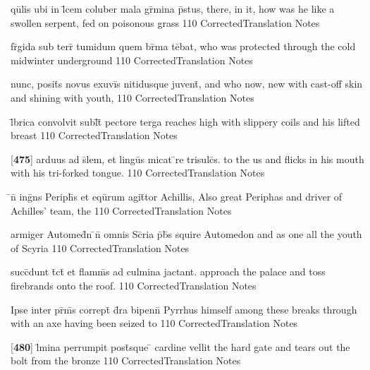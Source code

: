 \latline
  {qu\={}lis ubi in l\={}cem coluber mala gr\={}mina p\={}stus,}
  { there, in it, how was he like a swollen serpent, fed on poisonous grass }
  {110}
  { CorrectedTranslation }
  { Notes }


\latline
  {fr\={\macron {\i}}gida sub terr\={} tumidum quem br\={}ma te\={}bat,}
  { who was protected through the cold midwinter underground }
  {110}
  { CorrectedTranslation }
  { Notes }


\latline
  {nunc, posit\={\macron {\i}}s novus exuvi\={\macron {\i}}s nitidusque juvent\={},}
  { and who now, new with cast-off skin and shining with youth,  }
  {110}
  { CorrectedTranslation }
  { Notes }


\latline
  {l\={}brica convolvit subl\={}t\={} pectore terga}
  { reaches high with slippery coils and his lifted breast  }
  {110}
  { CorrectedTranslation }
  { Notes }


\latline
  {[\textbf{475}] arduus ad s\={}lem, et lingu\={\macron {\i}}s micat \={}re trisulc\={\macron {\i}}s.}
  { to the us and flicks in his mouth with his tri-forked tongue. }
  {110}
  { CorrectedTranslation }
  { Notes }


\latline
  {\={}n\={} ing\={}ns Periph\={}s et equ\={}rum agit\={}tor Achillis,}
  { Also great Periphas and driver of Achilles' team, the }
  {110}
  { CorrectedTranslation }
  { Notes }


\latline
  {armiger Automed\={}n \={}n\={} omnis Sc\={}ria p\={}b\={}s}
  { squire Automedon and as one all the youth of Scyria  }
  {110}
  { CorrectedTranslation }
  { Notes }


\latline
  {succ\={}dunt t\={}ct\={} et flamm\={}s ad culmina jactant.}
  { approach the palace and toss firebrands onto the roof. }
  {110}
  { CorrectedTranslation }
  { Notes }


\latline
  {Ipse inter pr\={\macron {\i}}m\={}s corrept\={} d\={}ra bipenn\={\macron {\i}}}
  { Pyrrhus himself among these breaks through with an axe having been seized to }
  {110}
  { CorrectedTranslation }
  { Notes }


\latline
  {[\textbf{480}] l\={\macron {\i}}mina perrumpit post\={\macron {\i}}sque \={} cardine vellit}
  { the hard gate and tears out the bolt from the bronze }
  {110}
  { CorrectedTranslation }
  { Notes }


